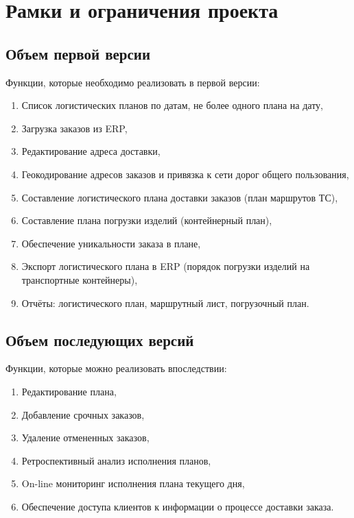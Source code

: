 \chapter{Рамки и ограничения проекта}
\label{ch:chap3}


\section{Объем первой версии}
\label{sec:mvp}

Функции, которые необходимо реализовать в первой версии:
\begin{enumerate}[label=MVP-\arabic*]
    \item Список логистических планов по датам, не более одного плана на дату,
    \item Загрузка заказов из ERP,
    \item Редактирование адреса доставки,
    \item Геокодирование адресов заказов и привязка к сети дорог общего пользования,
    \item Составление логистического плана доставки заказов (план маршрутов ТС),
    \item Составление плана погрузки изделий (контейнерный план),
    \item Обеспечение уникальности заказа в плане,
    \item Экспорт логистического плана в ERP (порядок погрузки изделий на транспортные контейнеры),
    \item Отчёты: логистического план, маршрутный лист, погрузочный план.
\end{enumerate}


\section{Объем последующих версий}
\label{sec:next}
Функции, которые можно реализовать впоследствии:
\begin{enumerate}[label=NXT-\arabic*]
    \item Редактирование плана,
    \item Добавление срочных заказов,
    \item Удаление отмененных заказов,
    \item Ретроспективный анализ исполнения планов,
    \item On-line мониторинг исполнения плана текущего дня,
    \item Обеспечение доступа клиентов к информации о процессе доставки заказа.
\end{enumerate}



